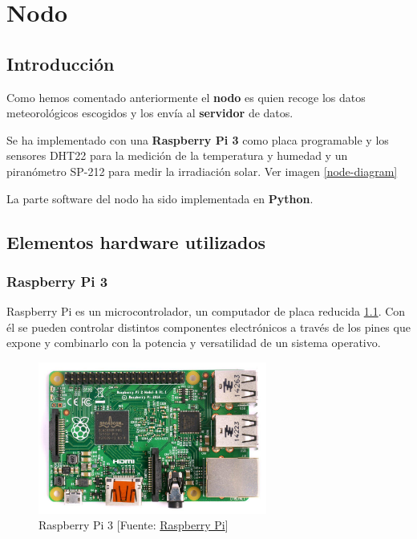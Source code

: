 \cleardoublepage

\chapter{Nodo}
\label{makereference2}

\section{Introducción}
\label{makereference2.1}
Como hemos comentado anteriormente el \textbf{nodo} es quien recoge los datos meteorológicos escogidos y los envía al \textbf{servidor} de datos.

Se ha implementado con una \textbf{Raspberry Pi 3} como placa programable y los sensores DHT22 para la medición de la temperatura y humedad y un piranómetro SP-212 para medir la irradiación solar. Ver imagen \ref{node-diagram}

La parte software del nodo ha sido implementada en \textbf{Python}.


\section{Elementos hardware utilizados}
\label{makereference2.2}

\subsection{Raspberry Pi 3}
\label{makereference2.2.1}

Raspberry Pi es un microcontrolador, un computador de placa reducida \ref{rasp}. Con él se pueden controlar distintos componentes electrónicos a través de los pines que expone y combinarlo con la potencia y versatilidad de un sistema operativo.

\begin{figure}[htb]
	\begin{center}
		\includegraphics[height=5cm]{figures/Raspberry_Pi.jpg}
		\caption{Raspberry Pi 3 [Fuente: \href{https://www.raspberrypi.org}{Raspberry Pi}]}
	\end{center}
	
	\label{rasp}
\end{figure}

